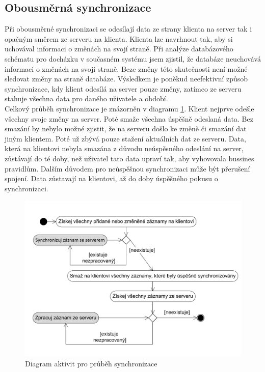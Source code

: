 \documentclass{diplomka}
\begin{document}
\subsection{Obousměrná synchronizace}
Při obousměrné synchronizaci se odesílají data ze strany klienta na server tak i opačným směrem ze serveru na klienta. Klienta lze navrhnout tak, aby si uchovával informaci o změnách na svojí straně. Při analýze databázového schématu pro docházku v současném systému jsem zjistil, že databáze neuchovává informaci o změnách na svojí straně. Beze změny této skutečnosti není možné sledovat změny na straně databáze. Výsledkem je poněkud neefektivní způsob synchronizace, kdy klient odesílá na server pouze změny, zatímco ze serveru stahuje všechna data pro daného uživatele a období.
\\ \indent
Celkový průběh synchronizace je znázorněn v diagramu \ref{fig:sync}. Klient nejprve odešle všechny svoje změny na server. Poté smaže všechna úspěšně odeslaná data. Bez smazání by nebylo možné zjistit, že na serveru došlo ke změně či smazání dat jiným klientem. Poté už zbývá pouze stažení aktuálních dat ze serveru. Data, která na klientovi nebyla smazána z důvodu neúspěsného odeslání na server, zůstávají do té doby, než uživatel tato data upraví tak, aby vyhovovala bussines pravidlům. Dalším důvodem pro neúspěšnou synchronizaci může být přerušení spojení. Data zůstavají na klientovi, až do doby úspěšného pokusu o synchronizaci.
\begin{figure}[H]
  \centering
  \includegraphics[scale=0.7]{visio/sync.pdf}
\caption{Diagram aktivit pro průběh synchronizace}
\label{fig:sync}
\end{figure}
\end{document}
